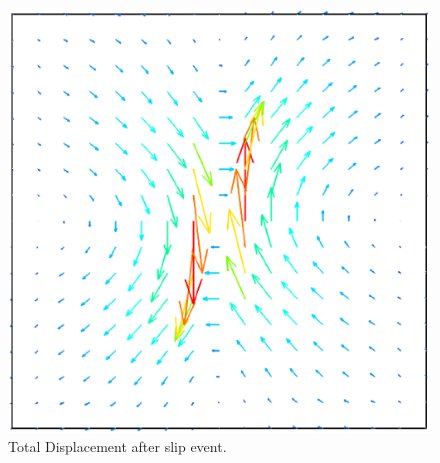 \begin{figure} [ht]
\centerline{\includegraphics[width=\figwidth]{figures/Slip2}}
\caption{Total Displacement after slip event.}
\label{fig:slip.2}
\end{figure}

